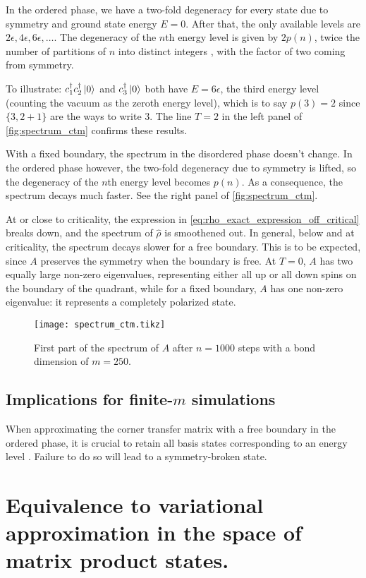 In the ordered phase, we have a two-fold degeneracy for every state due to symmetry and
ground state energy $E = 0$.
After that, the only available levels are $2\epsilon, 4\epsilon, 6\epsilon,
\dots$.
The degeneracy of the $n$th energy level is given by $2p(n)$, twice the number of partitions of $n$ into distinct integers
\cite{okunishi1999universal}, with the factor of two coming from symmetry.

To illustrate:
$c^{\dagger}_1 c^{\dagger}_2 \ket{0}$ and $c^{\dagger}_3 \ket{0}$ both have $E = 6\epsilon$,
the third energy level (counting the vacuum as the zeroth energy level),
which is to say $p(3) = 2$ since $\{3, 2 + 1 \}$ are the ways to write $3$.
The line $T = 2$ in the left panel of \autoref{fig:spectrum_ctm} confirms these results.

With a fixed boundary, the spectrum in the disordered phase doesn't change.
In the ordered phase however, the two-fold degeneracy due to symmetry is lifted,
so the degeneracy of the $n$th energy level becomes $p(n)$.
As a consequence, the spectrum decays much faster. See the right panel of \autoref{fig:spectrum_ctm}.

At or close to criticality, the expression in \autoref{eq:rho_exact_expression_off_critical} breaks down,
and the spectrum of $\hat{\rho}$ is smoothened out.
In general, below and at criticality, the spectrum decays slower for a free boundary.
This is to be expected, since $A$ preserves the symmetry when the boundary is free.
At $T = 0$, $A$ has two equally large non-zero eigenvalues, representing either all up or all down spins on the boundary
of the quadrant, while for a fixed boundary, $A$ has one non-zero eigenvalue:
it represents a completely polarized state.

\begin{figure}
  \texttt{[image: spectrum\_ctm.tikz]}
  \caption{First part of the spectrum of $A$ after $n = 1000$ steps with a bond dimension of $m =
  250$.}\label{fig:spectrum_ctm}
\end{figure}

\subsection{Implications for finite-$m$ simulations}

When approximating the corner transfer matrix with a free boundary in the ordered phase,
it is crucial to retain all basis states corresponding to an energy level \cite{okunishi1999universal}.
Failure to do so will lead to a symmetry-broken state.


\section{Equivalence to variational approximation in the space of matrix product states.}

